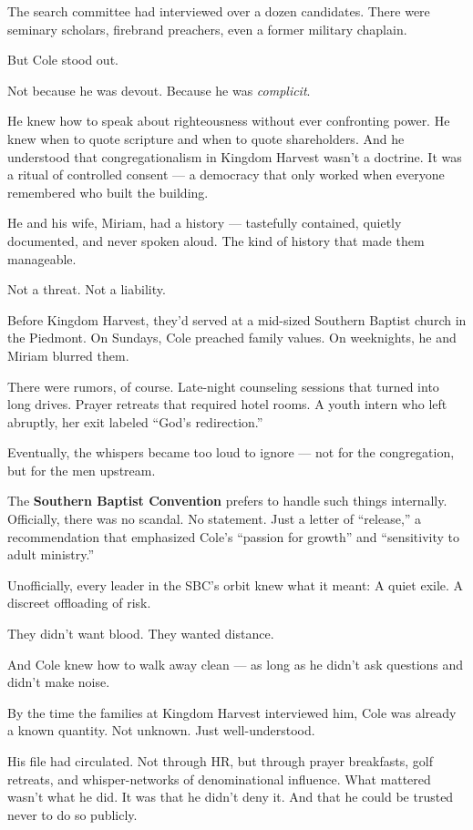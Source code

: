 The search committee had interviewed over a dozen candidates.  
There were seminary scholars, firebrand preachers, even a former military chaplain.

But Cole stood out.

Not because he was devout.  
Because he was \textit{complicit}.

He knew how to speak about righteousness without ever confronting power.  
He knew when to quote scripture and when to quote shareholders.  
And he understood that congregationalism in Kingdom Harvest wasn’t a doctrine.  
It was a ritual of controlled consent —  
a democracy that only worked when everyone remembered who built the building.


He and his wife, Miriam, had a history — tastefully contained, quietly documented, and never spoken aloud.  
The kind of history that made them manageable.

Not a threat.  
Not a liability.

Before Kingdom Harvest, they’d served at a mid-sized Southern Baptist church in the Piedmont.  
On Sundays, Cole preached family values.  
On weeknights, he and Miriam blurred them.

There were rumors, of course.  
Late-night counseling sessions that turned into long drives.  
Prayer retreats that required hotel rooms.  
A youth intern who left abruptly, her exit labeled “God’s redirection.”

Eventually, the whispers became too loud to ignore — not for the congregation, but for the men upstream.

The \textbf{Southern Baptist Convention} prefers to handle such things internally.  
Officially, there was no scandal.  
No statement.  
Just a letter of “release,” a recommendation that emphasized Cole’s “passion for growth” and “sensitivity to adult ministry.”

Unofficially, every leader in the SBC’s orbit knew what it meant:  
A quiet exile.  
A discreet offloading of risk.

They didn’t want blood.  
They wanted distance.

And Cole knew how to walk away clean — as long as he didn’t ask questions and didn’t make noise.

By the time the families at Kingdom Harvest interviewed him, Cole was already a known quantity.  
Not unknown.  
Just well-understood.

His file had circulated.  
Not through HR, but through prayer breakfasts, golf retreats, and whisper-networks of denominational influence.  
What mattered wasn’t what he did.  
It was that he didn’t deny it.  
And that he could be trusted never to do so publicly.

